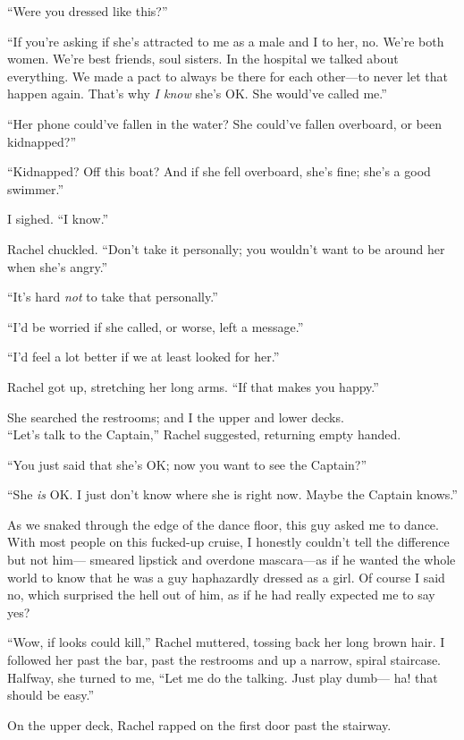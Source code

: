 ``Were you dressed like this?''

``If you're asking if she's attracted to me as a male and I to her, no.
We're both women. We're best friends, soul sisters. In the hospital we
talked about everything. We made a pact to always be there for each
other---to never let that happen again. That's why \emph{I know} she's
OK. She would've called me.''

``Her phone could've fallen in the water? She could've fallen overboard,
or been kidnapped?''

``Kidnapped? Off this boat? And if she fell overboard, she's fine; she's
a good swimmer.''

I sighed. ``I know.''

Rachel chuckled. ``Don't take it personally; you wouldn't want to be
around her when she's angry.''

``It's hard \emph{not} to take that personally.''

``I'd be worried if she called, or worse, left a message.''

``I'd feel a lot better if we at least looked for her.''

Rachel got up, stretching her long arms. ``If that makes you happy.''

She searched the restrooms; and I the upper and lower decks.\\

``Let's talk to the Captain,'' Rachel suggested, returning empty handed.

``You just said that she's OK; now you want to see the Captain?''

``She \emph{is} OK. I just don't know where she is right now. Maybe the
Captain knows.''

As we snaked through the edge of the dance floor, this guy asked me to
dance. With most people on this fucked-up cruise, I honestly couldn't
tell the difference but not him--- smeared lipstick and overdone
mascara---as if he wanted the whole world to know that he was a guy
haphazardly dressed as a girl. Of course I said no, which surprised the
hell out of him, as if he had really expected me to say yes?

``Wow, if looks could kill,'' Rachel muttered, tossing back her long
brown hair. I followed her past the bar, past the restrooms and up a
narrow, spiral staircase. Halfway, she turned to me, ``Let me do the
talking. Just play dumb--- ha! that should be easy.''

On the upper deck, Rachel rapped on the first door past the stairway.

